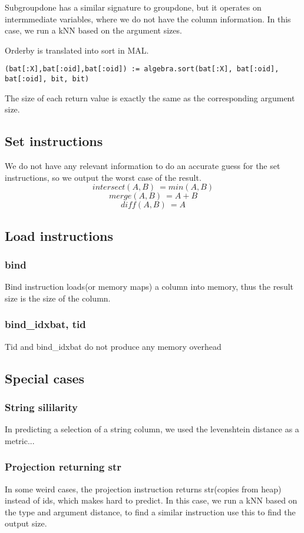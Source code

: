 Subgroupdone has a similar signature to groupdone, but it operates on intermmediate
variables, where we do not have the column information. In this case, we run a
kNN based on the argument sizes.

Orderby is translated into sort in MAL.
\begin{verbatim}
(bat[:X],bat[:oid],bat[:oid]) := algebra.sort(bat[:X], bat[:oid], bat[:oid], bit, bit)
\end{verbatim}
The size of each return value is exactly the same as the corresponding argument size.

\subsection{Set instructions}
We do not have any relevant information to do an accurate guess for the
set instructions, so we output the worst case of the result.
$$ intersect(A,B) ~= min(A,B)$$
$$ merge(A,B) ~= A+B $$
$$ diff(A,B) ~= A $$

\subsection{Load instructions}
\subsubsection{bind}
Bind instruction loads(or memory maps) a column into memory,
thus the result size is the size of the column.
\subsubsection{bind\_idxbat, tid}
Tid and bind\_idxbat do not produce any memory overhead

\subsection{Special cases}
\subsubsection{String sililarity}
In predicting a selection of a string column,
we used the levenshtein distance as a metric...
\subsubsection{Projection returning str}
In some weird cases, the projection instruction
returns str(copies from heap) instead of ids,
which makes hard to predict. In this case, we run a kNN
based on the type and argument distance, to find a similar
instruction use this to find the output size.
